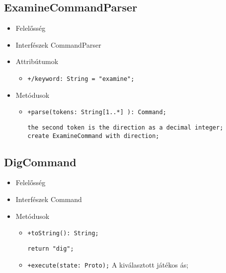 \subsection{ExamineCommandParser}
\begin{itemize}
\item Felelősség\newline
\item Interfészek\newline
CommandParser
\item Attribútumok
	\begin{itemize}
		\item \texttt{+/keyword: String = "examine";}
	\end{itemize}
\item Metódusok
\begin{itemize}
		\item \texttt{+parse(tokens: String[1..*] ): Command;}
		\begin{lstlisting}
the second token is the direction as a decimal integer;
create ExamineCommand with direction;
		\end{lstlisting}
	\end{itemize}
\end{itemize}

\subsection{DigCommand}
\begin{itemize}
\item Felelősség\newline
\item Interfészek\newline
Command
\item Metódusok
\begin{itemize}
		\item \texttt{+toString(): String;}
		\begin{lstlisting}
return "dig";
		\end{lstlisting}
		\item \texttt{+execute(state: Proto);} \newline
		A kiválasztott játékos ás;
	\end{itemize}
\end{itemize}
